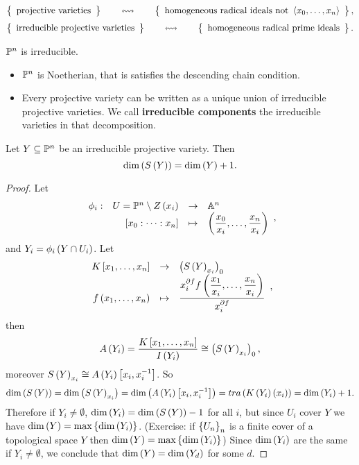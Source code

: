 \begin{corollary}
$$ \correspondence{\text{projective varieties}}{\text{homogeneous radical ideals not} \ \ab{x_0, \dots, x_n}}, $$
$$ \correspondence{\text{irreducible projective varieties}}{\text{homogeneous radical prime ideals}}. $$
\end{corollary}

\begin{example}
$ \P^n $ is irreducible.
\end{example}

\begin{proposition}
\hfill
\begin{itemize}
\item $ \P^n $ is Noetherian, that is satisfies the descending chain condition.
\item Every projective variety can be written as a unique union of irreducible projective varieties. We call \textbf{irreducible components} the irreducible varieties in that decomposition.
\end{itemize}
\end{proposition}

\begin{theorem}
Let $ Y \subseteq \P^n $ be an irreducible projective variety. Then
$$ \dim\rb{S\rb{Y}} = \dim\rb{Y} + 1. $$
\end{theorem}

\begin{proof}
Let
$$ \function[\phi_i]{U = \P^n \setminus Z\rb{x_i}}{\A^n}{\sb{x_0 : \dots : x_n}}{\rb{\dfrac{x_0}{x_i}, \dots, \dfrac{x_n}{x_i}}}, $$
and $ Y_i = \phi_i\rb{Y \cap U_i} $. Let
$$ \function{K\sb{x_1, \dots, x_n}}{\rb{S\rb{Y}_{x_i}}_0}{f\rb{x_1, \dots, x_n}}{\dfrac{x_i^{\partial f}f\rb{\dfrac{x_1}{x_i}, \dots, \dfrac{x_n}{x_i}}}{x_i^{\partial f}}}, $$
then
$$ A\rb{Y_i} = \dfrac{K\sb{x_1, \dots, x_n}}{I\rb{Y_i}} \cong \rb{S\rb{Y}_{x_i}}_0, $$
moreover $ S\rb{Y}_{x_i} \cong A\rb{Y_i}\sb{x_i, x_i^{-1}} $. So
$$ \dim\rb{S\rb{Y}} = \dim\rb{S\rb{Y}_{x_i}} = \dim\rb{A\rb{Y_i}\sb{x_i, x_i^{-1}}} = tra\rb{K\rb{Y_i}\rb{x_i}} = \dim\rb{Y_i} + 1. $$
Therefore if $ Y_i \ne \emptyset $, $ \dim\rb{Y_i} = \dim\rb{S\rb{Y}} - 1 $ for all $ i $, but since $ U_i $ cover $ Y $ we have $ \dim\rb{Y} = \max\cb{\dim\rb{Y_i}} $. (Exercise: if $ \cb{U_n}_n $ is a finite cover of a topological space $ Y $ then $ \dim\rb{Y} = \max\cb{\dim\rb{Y_i}} $) Since $ \dim\rb{Y_i} $ are the same if $ Y_i \ne \emptyset $, we conclude that $ \dim\rb{Y} = \dim\rb{Y_d} $ for some $ d $.
\end{proof}

